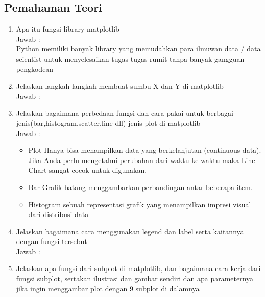 \subsection{Pemahaman Teori}
\begin{enumerate}
\item Apa itu fungsi library matplotlib\\
Jawab :\\
Python memiliki banyak library yang memudahkan para ilmuwan data / data scientist untuk menyelesaikan tugas-tugas rumit tanpa banyak gangguan pengkodean

\item Jelaskan langkah-langkah membuat sumbu X dan Y di matplotlib\\
Jawab :


\item Jelaskan bagaimana perbedaan fungsi dan cara pakai untuk berbagai jenis(bar,histogram,scatter,line dll) jenis plot di matplotlib\\
Jawab :
\begin{itemize}
\item Plot
Hanya bisa menampilkan data yang berkelanjutan (continuous data). Jika Anda perlu mengetahui perubahan dari waktu ke waktu maka Line Chart sangat cocok untuk digunakan.

\item Bar
Grafik batang menggambarkan perbandingan antar beberapa item.

\item Histogram
sebuah representasi grafik yang menampilkan impresi visual dari distribusi data

\end{itemize}

\item Jelaskan bagaimana cara menggunakan legend dan label serta kaitannya dengan fungsi tersebut\\
Jawab :


\item Jelaskan apa fungsi dari subplot di matplotlib, dan bagaimana cara kerja dari fungsi subplot, sertakan ilustrasi dan gambar sendiri dan apa parameternya jika ingin menggambar plot dengan 9 subplot di dalamnya\\



\end{enumerate}
